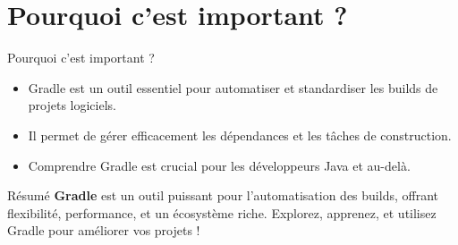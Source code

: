 \documentclass{clbeamer2024}
\begin{document}
    
    \section{Pourquoi c'est important ?}
    \begin{frame}{Pourquoi c'est important ?}
    	\begin{itemize}
    		\item Gradle est un outil essentiel pour automatiser et standardiser les builds de projets logiciels.
    		\item Il permet de gérer efficacement les dépendances et les tâches de construction.
    		\item Comprendre Gradle est crucial pour les développeurs Java et au-delà.
    	\end{itemize}
    \end{frame}
	
	
	\begin{frame}{Résumé}
		\textbf{Gradle} est un outil puissant pour l'automatisation des builds, offrant flexibilité, performance, et un écosystème riche.  
		Explorez, apprenez, et utilisez Gradle pour améliorer vos projets ! 
	\end{frame}
	

	
\end{document}
